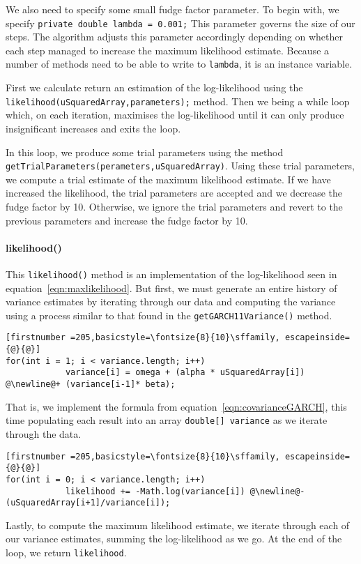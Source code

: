 \documentclass[../Dissertation.tex]{subfiles}
\begin{document}
We also need to specify some small fudge factor parameter.
To begin with, we specify \lstinline|private double lambda = 0.001;|
This parameter governs the size of our steps.
The algorithm adjusts this parameter accordingly depending on whether each step managed to increase the maximum likelihood estimate.
Because a number of methods need to be able to write to \lstinline|lambda|, it is an instance variable.

First we calculate return an estimation of the log-likelihood using the \lstinline|likelihood(uSquaredArray,parameters);| method.
Then we being a while loop which, on each iteration, maximises the log-likelihood until it can only produce insignificant increases and exits the loop.

In this loop, we produce some trial parameters using the method \lstinline|getTrialParameters(perameters,uSquaredArray)|.
Using these trial parameters, we compute a trial estimate of the maximum likelihood estimate.
If we have increased the likelihood, the trial parameters are accepted and we decrease the fudge factor by 10.
Otherwise, we ignore the trial parameters and revert to the previous parameters and increase the fudge factor by 10.

\paragraph{likelihood()}

This \lstinline|likelihood()| method is an implementation of the log-likelihood seen in equation~\ref{eqn:maxlikelihood}.
But first, we must generate an entire history of variance estimates by iterating through our data and computing the variance using a process similar to that found in the \lstinline|getGARCH11Variance()| method.
\begin{lstlisting}[firstnumber =205,basicstyle=\fontsize{8}{10}\sffamily, escapeinside={@}{@}]
for(int i = 1; i < variance.length; i++)
            variance[i] = omega + (alpha * uSquaredArray[i]) @\newline@+ (variance[i-1]* beta);
\end{lstlisting}
That is, we implement the formula from equation~\ref{eqn:covarianceGARCH}, this time populating each result into an array \lstinline|double[] variance| as we iterate through the data.
\begin{lstlisting}[firstnumber =205,basicstyle=\fontsize{8}{10}\sffamily, escapeinside={@}{@}]
for(int i = 0; i < variance.length; i++)
            likelihood += -Math.log(variance[i]) @\newline@- (uSquaredArray[i+1]/variance[i]);
\end{lstlisting}
Lastly, to compute the maximum likelihood estimate, we iterate through each of our variance estimates, summing the log-likelihood as we go.
At the end of the loop, we return \lstinline|likelihood|.
\end{document}

